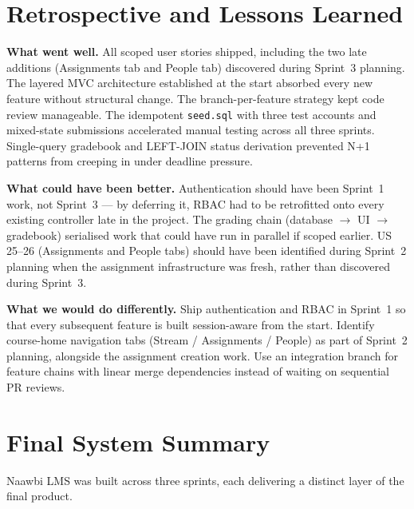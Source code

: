 \documentclass[12pt, a4paper]{article}
\begin{document}
\section{Retrospective and Lessons Learned}
\label{sec:retro}

\textbf{What went well.} All scoped user stories shipped, including the two
late additions (Assignments tab and People tab) discovered during Sprint~3
planning. The layered MVC architecture established at the start absorbed
every new feature without structural change. The branch-per-feature strategy
kept code review manageable. The idempotent \texttt{seed.sql} with three test
accounts and mixed-state submissions accelerated manual testing across all
three sprints. Single-query gradebook and LEFT-JOIN status derivation
prevented N+1 patterns from creeping in under deadline pressure.

\textbf{What could have been better.} Authentication should have been
Sprint~1 work, not Sprint~3 --- by deferring it, RBAC had to be retrofitted
onto every existing controller late in the project. The grading chain
(database $\rightarrow$ UI $\rightarrow$ gradebook) serialised work that
could have run in parallel if scoped earlier. US\,25--26 (Assignments and
People tabs) should have been identified during Sprint~2 planning when the
assignment infrastructure was fresh, rather than discovered during Sprint~3.

\textbf{What we would do differently.} Ship authentication and RBAC in
Sprint~1 so that every subsequent feature is built session-aware from the
start. Identify course-home navigation tabs (Stream / Assignments / People)
as part of Sprint~2 planning, alongside the assignment creation work. Use
an integration branch for feature chains with linear merge dependencies
instead of waiting on sequential PR reviews.

\section{Final System Summary}

Naawbi LMS was built across three sprints, each delivering a distinct layer
of the final product.
\end{document}
